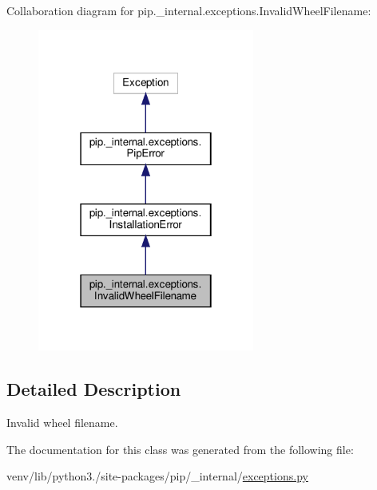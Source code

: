 Collaboration diagram for pip.\+\_\+internal.\+exceptions.\+Invalid\+Wheel\+Filename\+:
\nopagebreak
\begin{figure}[H]
\begin{center}
\leavevmode
\includegraphics[width=202pt]{classpip_1_1__internal_1_1exceptions_1_1InvalidWheelFilename__coll__graph}
\end{center}
\end{figure}


\subsection{Detailed Description}
\begin{DoxyVerb}Invalid wheel filename.\end{DoxyVerb}
 

The documentation for this class was generated from the following file\+:\begin{DoxyCompactItemize}
\item 
venv/lib/python3./site-\/packages/pip/\+\_\+internal/\hyperlink{pip_2__internal_2exceptions_8py}{exceptions.\+py}\end{DoxyCompactItemize}
